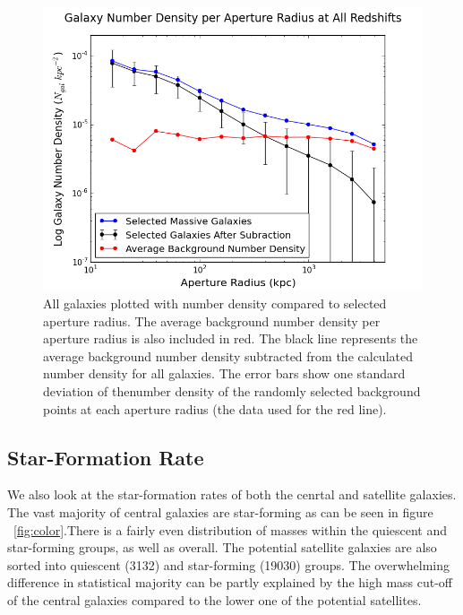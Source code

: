 \documentclass[apj]{emulateapj}
\begin{document}
\begin{figure}
\centering
\graphicspath{{C:/3d_hst/2015_finals/aperture_distance/}}
\includegraphics[width=\linewidth]{temp_compare}
\caption{\footnotesize All galaxies plotted with number density compared to selected aperture radius. The average background number density per aperture radius is also included in red. The black line represents the average background number density subtracted from the calculated number density for all galaxies. The error bars show one standard deviation of thenumber density of the randomly selected background points at each aperture radius (the data used for the red line).}
\label{fig:compare}
\end{figure}

\subsection{Star-Formation Rate}

We also look at the star-formation rates of both the cenrtal and satellite galaxies. The vast majority of central galaxies are star-forming as can be seen in figure ~\ref{fig:color}.There is a fairly even distribution of masses within the quiescent and star-forming groups, as well as overall. The potential satellite galaxies are also sorted into quiescent (3132) and star-forming (19030) groups. The overwhelming difference in statistical majority can be partly explained by the high mass cut-off of the central galaxies compared to the lower one of the potential satellites. 
\end{document}
